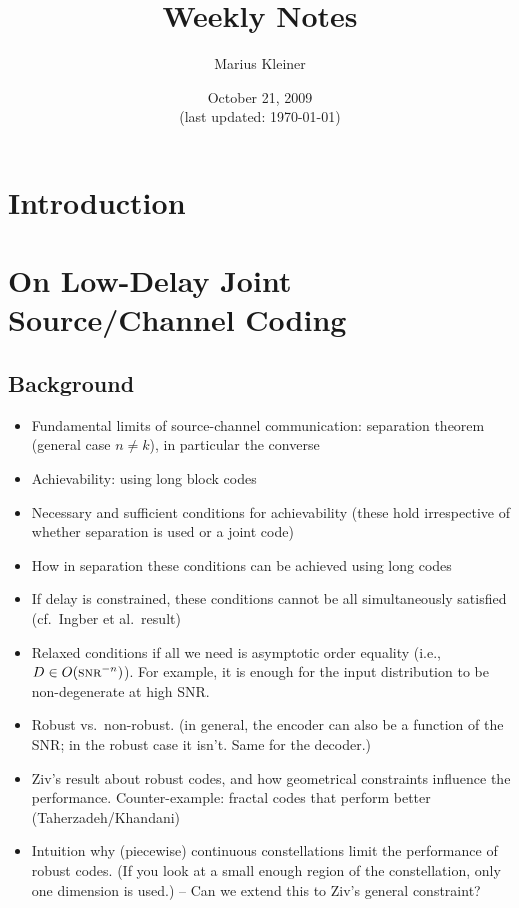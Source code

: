 \documentclass[a4paper]{article}
\title{Weekly Notes}
\author{Marius Kleiner}
\date{October 21, 2009\\\small(last updated: \today)}
\theoremstyle{definition}
\begin{document}
\maketitle

\section{Introduction}

\section{On Low-Delay Joint Source/Channel Coding}
\subsection{Background}
\begin{itemize}
  \item Fundamental limits of source-channel communication: separation theorem
    (general case $n \ne k$), in particular the converse
  \item Achievability: using long block codes
  \item Necessary and sufficient conditions for achievability (these hold
    irrespective of whether separation is used or a joint code) 
  \item How in separation these conditions can be achieved using long codes
  \item If delay is constrained, these conditions cannot be all simultaneously
    satisfied (cf.~Ingber et al.\ result)
  \item Relaxed conditions if all we need is asymptotic order equality (i.e., $D
    \in O(\textsc{snr}^{-n})$). For example, it is enough for the input
    distribution to be non-degenerate at high SNR.
  \item Robust vs.\ non-robust. (in general, the encoder can also be a function
    of the SNR; in the robust case it isn't. Same for the decoder.)
  \item Ziv's result about robust codes, and how geometrical constraints
    influence the performance. Counter-example: fractal codes that perform
    better (Taherzadeh\slash Khandani)
  \item Intuition why (piecewise) continuous constellations limit the
    performance of robust codes. (If you look at a small enough region of the
    constellation, only one dimension is used.) -- Can we extend this to Ziv's
    general constraint?
\end{itemize}
\end{document}
